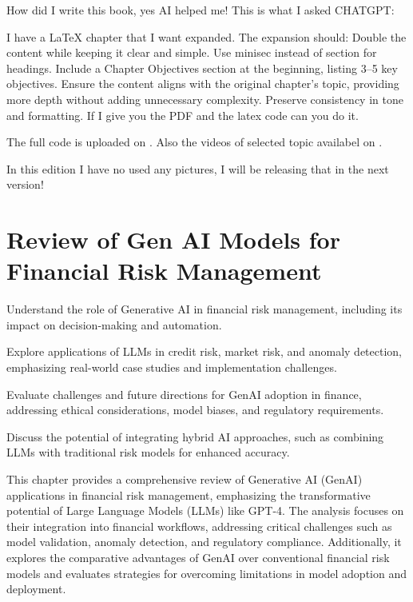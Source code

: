 \documentclass[a4paper,headinclude=on,footinclude=on,12pt,oneside]{scrbook}
\begin{document}
	How did I write this book, yes AI helped me!
	This is what I asked CHATGPT:
	
	I have a LaTeX chapter that I want expanded. The expansion should:
	Double the content while keeping it clear and simple.
	Use minisec instead of section for headings.
	Include a Chapter Objectives section at the beginning, listing 3–5 key objectives.
	Ensure the content aligns with the original chapter's topic, providing more depth without adding unnecessary complexity.
	Preserve consistency in tone and formatting.
	If I give you the PDF and the latex code can you do it.
	
	
	The full code is uploaded on \cite{JoshiGit2025}.
	Also the videos of selected topic availabel on \cite{JoshiYouTube2025}.
	
		In this edition I have no used any pictures, I will be releasing that in the  next version!  
	
	
	
	
	\chapter{Review of Gen AI Models for Financial Risk Management}
	
	\begin{arrows}
		\item Understand the role of Generative AI in financial risk management, including its impact on decision-making and automation.
		\item Explore applications of LLMs in credit risk, market risk, and anomaly detection, emphasizing real-world case studies and implementation challenges.
		\item Evaluate challenges and future directions for GenAI adoption in finance, addressing ethical considerations, model biases, and regulatory requirements.
		\item Discuss the potential of integrating hybrid AI approaches, such as combining LLMs with traditional risk models for enhanced accuracy.
	\end{arrows}
	
	This chapter provides a comprehensive review of Generative AI (GenAI) applications in financial risk management, emphasizing the transformative potential of Large Language Models (LLMs) like GPT-4. The analysis focuses on their integration into financial workflows, addressing critical challenges such as model validation, anomaly detection, and regulatory compliance. Additionally, it explores the comparative advantages of GenAI over conventional financial risk models and evaluates strategies for overcoming limitations in model adoption and deployment.
	
\end{document}
